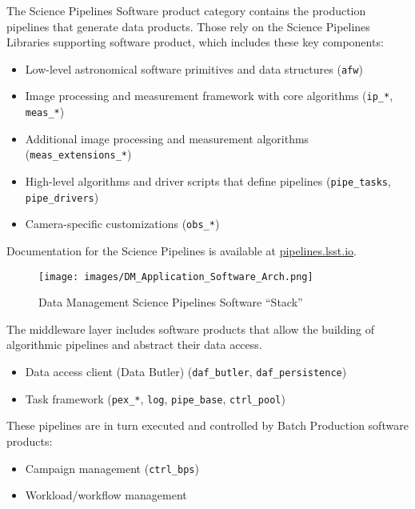 \documentclass[DM,toc,lsstdraft]{lsstdoc}
\begin{document}
The Science Pipelines Software product category contains the production pipelines that generate data products.
Those rely on the Science Pipelines Libraries supporting software product, which includes these key components:
\begin{itemize}
\item
  Low-level astronomical software primitives and data structures
  (\texttt{afw})
\item
  Image processing and measurement framework with core algorithms
  (\texttt{ip\_*}, \texttt{meas\_*})
\item
  Additional image processing and measurement algorithms
  (\texttt{meas\_extensions\_*})
\item
  High-level algorithms and driver scripts that define pipelines
  (\texttt{pipe\_tasks}, \texttt{pipe\_drivers})
\item
  Camera-specific customizations (\texttt{obs\_*})
\end{itemize}
Documentation for the Science Pipelines is available at \href{https://pipelines.lsst.io/}{pipelines.lsst.io}.

\begin{figure}
\centering
\texttt{[image: images/DM\_Application\_Software\_Arch.png]}
\caption{Data Management Science Pipelines Software ``Stack''}
\label{fig:scipi}
\end{figure}

The middleware layer includes software products that allow the building of algorithmic pipelines and abstract their data access.
\begin{itemize}
\item
  Data access client (Data Butler) (\texttt{daf\_butler}, \texttt{daf\_persistence})
\item
  Task framework (\texttt{pex\_*}, \texttt{log}, \texttt{pipe\_base}, \texttt{ctrl\_pool})
\end{itemize}

These pipelines are in turn executed and controlled by Batch Production software products:
\begin{itemize}
\item
  Campaign management (\texttt{ctrl\_bps})
\item
  Workload/workflow management
\end{itemize}
\end{document}
